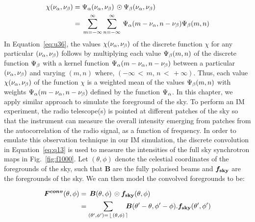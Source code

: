  \begin{equation}
   \begin{aligned}
   \chi(\nu_{\rm \alpha}, \nu_{\rm \beta}) &=   \Psi_{\rm \alpha}(\nu_{\rm \alpha}, \nu_{\rm \beta}) \,\odot \Psi_{\rm \beta}(\nu_{\rm \alpha}, \nu_{\rm \beta}) \\ 
  &= \, \sum_{m = - \infty}^{\infty} \sum_{n = - \infty}^{\infty} \,   \Psi_{\rm \alpha} (m - \nu_{\rm \alpha}, n - \nu_{\rm \beta}) \Psi_{\rm \beta}(m, n)
  \end{aligned}
\label{eq:u36} 
\end{equation}
%
In Equation~\ref{eq:u36}, the values $  \chi(\nu_{\rm \alpha}, \nu_{\rm \beta})$ of the discrete function $ \chi$ for any particular $ (\nu_{\rm \alpha}, \nu_{\rm \beta})$ follows by multiplying
each value $ \Psi_{\rm \beta}(m, n)$ of the discrete function $ \Psi_{\rm \beta}$ with a kernel function $ \Psi_{\rm \alpha} (m - \nu_{\rm \alpha}, n - \nu_{\rm \beta})$
between a particular 
$ (\nu_{\rm \alpha}, \nu_{\rm \beta})$ and varying $(m, n)$ where, $(- \infty \, < \, m, \, n \, <  \, + \infty)$. Thus, each value $  \chi(\nu_{\rm \alpha}, \nu_{\rm \beta})$ of the function 
$ \chi$ is a weighted mean of the values $ \Psi_{\rm \beta}(m, n)$ with weights $ \Psi_{\rm \alpha} (m - \nu_{\rm \alpha}, n - \nu_{\rm \beta})$ defined by the function
$ \Psi_{\rm \alpha}$. In this chapter, we apply similar approach to simulate the foreground of the sky.
To perform an IM experiment, the radio telescope(s) is pointed at different patches of the sky so that the instrument can measure the overall
intensity emerging from patches from the autocorrelation of the radio signal, as a function of frequency. In order to emulate this observation 
technique in our IM simulation, the discrete convolution in Equation~\ref{eq:q13} is used to measure the intensities of the full sky synchrotron 
maps in Fig.~\ref{fig:f1000}. Let $(\theta, \phi)$ denote the celestial coordinates of the foregrounds of the sky, such that $\bm{B}$ are the fully
polarised beams  and $\boldsymbol{f_{\rm sky}}$ are the foregrounds of the sky. We can then model the convolved foregrounds to be: 
 
\begin{equation}	\label{eq:q13}  
\begin{aligned}  
  \boldsymbol{F^{conv}}(\theta, \phi) & =\,  \boldsymbol{B}(\theta, \phi) \, \odot \boldsymbol{f_{\rm sky}}(\theta, \phi) \\
  & = \sum_{ (\theta', \phi') = \,\lfloor \, (\theta, \phi) \, \rceil} \!\!\!  
  \boldsymbol{B}(\theta' - \theta, \phi' - \phi).\boldsymbol{f_{\rm sky}}(\theta', \phi')
\end{aligned} 
  \end{equation}
 
